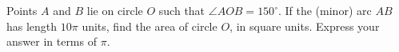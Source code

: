 Points $A$ and $B$ lie on circle $O$ such that $\angle AOB=150^\circ$. If the (minor) arc $AB$ has length $10\pi$ units, find the area of circle $O$, in square units. Express your answer in terms of $\pi$.
